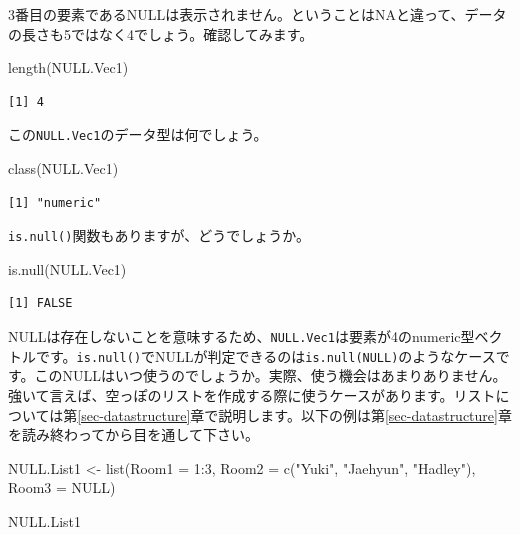 \documentclass[
  a4paper,
  pandoc,
  ja=standard,
  jafont=haranoaji]{bxjsbook}
\newenvironment{Shaded}{\begin{snugshade}}{\end{snugshade}}
\newcommand{\AttributeTok}[1]{\textcolor[rgb]{0.00,0.48,0.65}{#1}}
\newcommand{\ConstantTok}[1]{\textcolor[rgb]{0.56,0.35,0.01}{#1}}
\newcommand{\DecValTok}[1]{\textcolor[rgb]{0.68,0.00,0.00}{#1}}
\newcommand{\FunctionTok}[1]{\textcolor[rgb]{0.28,0.35,0.67}{#1}}
\newcommand{\NormalTok}[1]{\textcolor[rgb]{0.00,0.48,0.65}{#1}}
\newcommand{\OtherTok}[1]{\textcolor[rgb]{0.00,0.48,0.65}{#1}}
\newcommand{\SpecialCharTok}[1]{\textcolor[rgb]{0.37,0.37,0.37}{#1}}
\newcommand{\StringTok}[1]{\textcolor[rgb]{0.13,0.47,0.30}{#1}}
\begin{document}
3番目の要素であるNULLは表示されません。ということはNAと違って、データの長さも5ではなく4でしょう。確認してみます。

\begin{Shaded}
\begin{Highlighting}[numbers=left,,]
\FunctionTok{length}\NormalTok{(NULL.Vec1)}
\end{Highlighting}
\end{Shaded}

\begin{verbatim}
[1] 4
\end{verbatim}

この\texttt{NULL.Vec1}のデータ型は何でしょう。

\begin{Shaded}
\begin{Highlighting}[numbers=left,,]
\FunctionTok{class}\NormalTok{(NULL.Vec1)}
\end{Highlighting}
\end{Shaded}

\begin{verbatim}
[1] "numeric"
\end{verbatim}

\texttt{is.null()}関数もありますが、どうでしょうか。

\begin{Shaded}
\begin{Highlighting}[numbers=left,,]
\FunctionTok{is.null}\NormalTok{(NULL.Vec1)}
\end{Highlighting}
\end{Shaded}

\begin{verbatim}
[1] FALSE
\end{verbatim}

NULLは存在しないことを意味するため、\texttt{NULL.Vec1}は要素が4のnumeric型ベクトルです。\texttt{is.null()}でNULLが判定できるのは\texttt{is.null(NULL)}のようなケースです。このNULLはいつ使うのでしょうか。実際、使う機会はあまりありません。強いて言えば、空っぽのリストを作成する際に使うケースがあります。リストについては第\ref{sec-datastructure}章で説明します。以下の例は第\ref{sec-datastructure}章を読み終わってから目を通して下さい。

\begin{Shaded}
\begin{Highlighting}[numbers=left,,]
\NormalTok{NULL.List1 }\OtherTok{\textless{}{-}} \FunctionTok{list}\NormalTok{(}\AttributeTok{Room1 =} \DecValTok{1}\SpecialCharTok{:}\DecValTok{3}\NormalTok{,}
                   \AttributeTok{Room2 =} \FunctionTok{c}\NormalTok{(}\StringTok{"Yuki"}\NormalTok{, }\StringTok{"Jaehyun"}\NormalTok{, }\StringTok{"Hadley"}\NormalTok{),}
                   \AttributeTok{Room3 =} \ConstantTok{NULL}\NormalTok{)}

\NormalTok{NULL.List1}
\end{Highlighting}
\end{Shaded}
\end{document}
